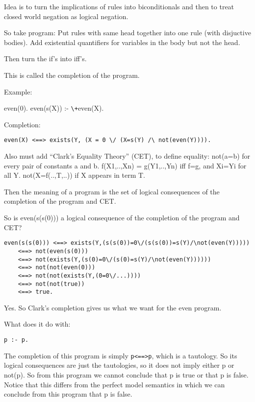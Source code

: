Idea is to turn the implications of rules into biconditionals and then
to treat closed world negation as logical negation. 

So take program:
Put rules with same head together into one rule (with disjuctive
bodies).  Add existential quantifiers for variables in the body but
not the head.

Then turn the if's into iff's.

This is called the completion of the program.

Example:

even(0).
even(s(X)) :- \verb|\+|even(X).

Completion:

\begin{verbatim}
even(X) <==> exists(Y, (X = 0 \/ (X=s(Y) /\ not(even(Y)))).
\end{verbatim}

Also must add ``Clark's Equality Theory'' (CET), to define equality:
not(a=b) for every pair of constants a and b.  
f(X1,..,Xn) = g(Y1,..,Yn) iff f=g, and Xi=Yi for all Y.  
not(X=f(..,T,..)) if X appears in term T.

Then the meaning of a program is the set of logical consequences of
the completion of the program and CET.

So is even(s(s(0))) a logical consequence of the completion of the
program and CET?

\begin{verbatim}
even(s(s(0))) <==> exists(Y,(s(s(0))=0\/(s(s(0))=s(Y)/\not(even(Y)))))
    <==> not(even(s(0)))
    <==> not(exists(Y,(s(0)=0\/(s(0)=s(Y)/\not(even(Y))))))
    <==> not(not(even(0)))
    <==> not(not(exists(Y,(0=0\/...))))
    <==> not(not(true))
    <==> true.
\end{verbatim}

Yes.  So Clark's completion gives us what we want for the even
program.

What does it do with:
\begin{verbatim}
p :- p.
\end{verbatim}
The completion of this program is simply \verb|p<==>p|, which is a
tautology.  So its logical consequences are just the tautologies, so
it does not imply either p or not(p).  So from this program we cannot
conclude that p is true or that p is false.  Notice that this differs
from the perfect model semantics in which we can conclude from this
program that p is false.


